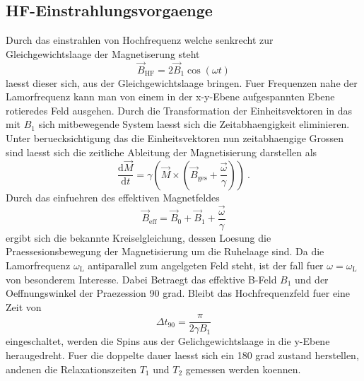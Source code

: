 \subsection{HF-Einstrahlungsvorgaenge}%
\label{sub:hf_einstrahlungsvorgaenge}
Durch das einstrahlen von Hochfrequenz welche senkrecht zur Gleichgewichtslaage
der Magnetiserung steht 
\begin{equation}
		\label{eq:bhf}
		\vec{B}_\text{HF} = 2 \vec{B}_1 \cos(\omega t)
\end{equation}
laesst dieser sich, aus der Gleichgewichtslaage bringen. 
Fuer Frequenzen nahe der Lamorfrequenz kann man von einem in der x-y-Ebene
aufgespannten Ebene rotieredes Feld ausgehen. 
Durch die Transformation der Einheitsvektoren in das mit $B_1$ sich mitbewegende
System laesst sich die Zeitabhaengigkeit eliminieren. 
Unter beruecksichtigung das die Einheitsvektoren nun zeitabhaengige Grossen sind
laesst sich die zeitliche Ableitung der Magnetisierung darstellen als 
\begin{equation}
		\label{eq:moment}
		\frac{\text{d}\vec{M}}{\text{d} t} = \gamma \left( \vec{M} \times \left(
		\vec{B}_\text{ges} + \frac{\vec{\omega}}{\gamma} \right) \right) \ .
\end{equation}
Durch das einfuehren des effektiven Magnetfeldes 
\begin{equation}
		\label{eq:sumB}
		\vec{B}_\text{eff} = \vec{B}_0 + \vec{B}_1 + \frac{\vec{\omega}}{\gamma}
\end{equation}
ergibt sich die bekannte Kreiselgleichung, dessen Loesung die
Praessesionsbewegung der Magnetisierung um die Ruhelaage sind. 
Da die Lamorfrequenz $\omega_\text{L}$ antiparallel zum angelgeten Feld steht,
ist der fall fuer $\omega = \omega_\text{L}$ von besonderem Interesse.
Dabei Betraegt das effektive B-Feld $B_1$ und der Oeffnungswinkel der
Praezession 90 grad. 
Bleibt das Hochfrequenzfeld fuer eine Zeit von 
\begin{equation}
		\label{eq:90kick}
		\Delta t_{90} = \frac{\pi}{2 \gamma B_1}
\end{equation}
eingeschaltet, werden die Spins aus der Gelichgewichtslaage in die y-Ebene
heraugedreht. 
Fuer die doppelte dauer laesst sich ein 180 grad zustand herstellen, andenen die
Relaxationszeiten $T_1$ und $T_2$ gemessen werden koennen. 


